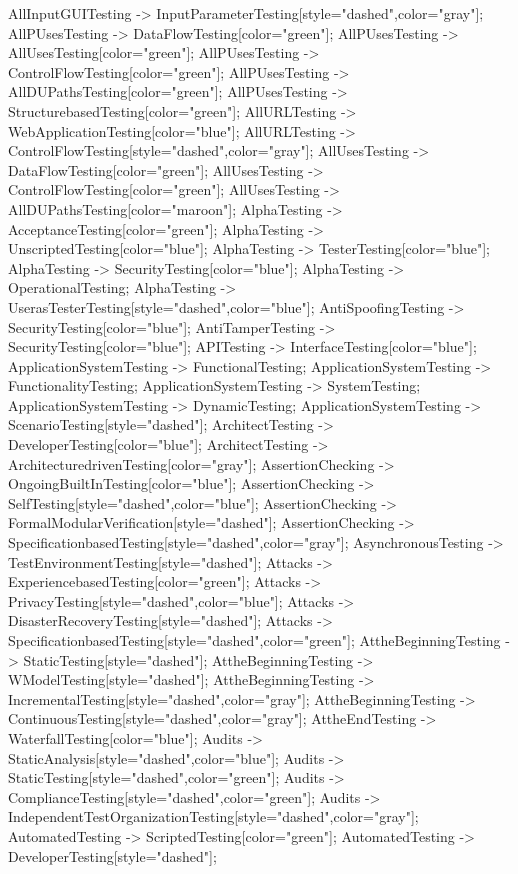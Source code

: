 \documentclass{article}
\begin{document}
{AllInputGUITesting -> InputParameterTesting[style="dashed",color="gray"];
AllPUsesTesting -> DataFlowTesting[color="green"];
AllPUsesTesting -> AllUsesTesting[color="green"];
AllPUsesTesting -> ControlFlowTesting[color="green"];
AllPUsesTesting -> AllDUPathsTesting[color="green"];
AllPUsesTesting -> StructurebasedTesting[color="green"];
AllURLTesting -> WebApplicationTesting[color="blue"];
AllURLTesting -> ControlFlowTesting[style="dashed",color="gray"];
AllUsesTesting -> DataFlowTesting[color="green"];
AllUsesTesting -> ControlFlowTesting[color="green"];
AllUsesTesting -> AllDUPathsTesting[color="maroon"];
AlphaTesting -> AcceptanceTesting[color="green"];
AlphaTesting -> UnscriptedTesting[color="blue"];
AlphaTesting -> TesterTesting[color="blue"];
AlphaTesting -> SecurityTesting[color="blue"];
AlphaTesting -> OperationalTesting;
AlphaTesting -> UserasTesterTesting[style="dashed",color="blue"];
AntiSpoofingTesting -> SecurityTesting[color="blue"];
AntiTamperTesting -> SecurityTesting[color="blue"];
APITesting -> InterfaceTesting[color="blue"];
ApplicationSystemTesting -> FunctionalTesting;
ApplicationSystemTesting -> FunctionalityTesting;
ApplicationSystemTesting -> SystemTesting;
ApplicationSystemTesting -> DynamicTesting;
ApplicationSystemTesting -> ScenarioTesting[style="dashed"];
ArchitectTesting -> DeveloperTesting[color="blue"];
ArchitectTesting -> ArchitecturedrivenTesting[color="gray"];
AssertionChecking -> OngoingBuiltInTesting[color="blue"];
AssertionChecking -> SelfTesting[style="dashed",color="blue"];
AssertionChecking -> FormalModularVerification[style="dashed"];
AssertionChecking -> SpecificationbasedTesting[style="dashed",color="gray"];
AsynchronousTesting -> TestEnvironmentTesting[style="dashed"];
Attacks -> ExperiencebasedTesting[color="green"];
Attacks -> PrivacyTesting[style="dashed",color="blue"];
Attacks -> DisasterRecoveryTesting[style="dashed"];
Attacks -> SpecificationbasedTesting[style="dashed",color="green"];
AttheBeginningTesting -> StaticTesting[style="dashed"];
AttheBeginningTesting -> WModelTesting[style="dashed"];
AttheBeginningTesting -> IncrementalTesting[style="dashed",color="gray"];
AttheBeginningTesting -> ContinuousTesting[style="dashed",color="gray"];
AttheEndTesting -> WaterfallTesting[color="blue"];
Audits -> StaticAnalysis[style="dashed",color="blue"];
Audits -> StaticTesting[style="dashed",color="green"];
Audits -> ComplianceTesting[style="dashed",color="green"];
Audits -> IndependentTestOrganizationTesting[style="dashed",color="gray"];
AutomatedTesting -> ScriptedTesting[color="green"];
AutomatedTesting -> DeveloperTesting[style="dashed"];
}
\end{document}
